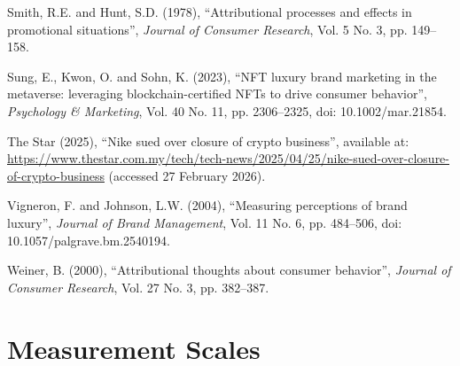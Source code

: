 \documentclass[12pt, a4paper]{article}
\newenvironment{referenceshang}{%
  \par\begingroup
  \setlength{\parindent}{0pt}%
  \setlength{\parskip}{0.5\baselineskip}%
  \everypar{\hangindent=1.5em\hangafter=1\relax}%
  \ignorespaces
}{%
  \par\endgroup
}
\renewcommand{\thetable}{\Roman{table}}
\begin{document}
\begin{referenceshang}
Smith, R.E. and Hunt, S.D. (1978), ``Attributional processes and effects in promotional situations'', \emph{Journal of Consumer Research}, Vol. 5 No. 3, pp. 149--158.

Sung, E., Kwon, O. and Sohn, K. (2023), ``NFT luxury brand marketing in the metaverse: leveraging blockchain-certified NFTs to drive consumer behavior'', \emph{Psychology \& Marketing}, Vol. 40 No. 11, pp. 2306--2325, doi: 10.1002/mar.21854.

The Star (2025), ``Nike sued over closure of crypto business'', available at: \url{https://www.thestar.com.my/tech/tech-news/2025/04/25/nike-sued-over-closure-of-crypto-business} (accessed 27 February 2026).

Vigneron, F. and Johnson, L.W. (2004), ``Measuring perceptions of brand luxury'', \emph{Journal of Brand Management}, Vol. 11 No. 6, pp. 484--506, doi: 10.1057/palgrave.bm.2540194.

Weiner, B. (2000), ``Attributional thoughts about consumer behavior'', \emph{Journal of Consumer Research}, Vol. 27 No. 3, pp. 382--387.

\end{referenceshang}

\newpage
\appendix
\setcounter{table}{0}
\renewcommand{\thetable}{A.\arabic{table}}
\renewcommand{\theHtable}{A.\arabic{table}}
\section{Measurement Scales}
\end{document}
